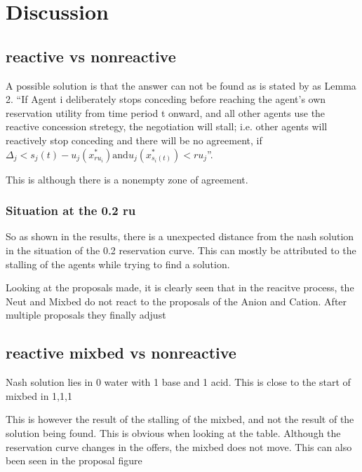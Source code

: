 \section{Discussion}
\subsection{reactive vs nonreactive}
A possible solution is that the answer can not be found as is stated by \citet{zheng2015automated} as Lemma 2. ``If Agent i deliberately stops conceding before reaching the agent's own reservation utility from time period t onward, and all other agents use the reactive concession stretegy, the negotiation will stall; i.e. other agents will reactively stop conceding and there will be no agreement, if $\Delta_j < s_j(t)-u_j(x^*_{ru_i}) \text{and} u_j(x^*_{s_i(t)})<ru_j$''.

This is although there is a nonempty zone of agreement.

\subsubsection{Situation at the 0.2 ru}
So as shown in the results, there is a unexpected distance from the nash solution in the situation of the 0.2 reservation curve. This can mostly be attributed to the stalling of the agents while trying to find a solution.

Looking at the proposals made, it is clearly seen that in the reacitve process, the Neut and Mixbed do not react to the proposals of the Anion and Cation. After multiple proposals they finally adjust 


\subsection{reactive mixbed vs nonreactive}
Nash solution lies in 0 water with 1 base and 1 acid. This is close to the start of mixbed in 1,1,1

This is however the result of the stalling of the mixbed, and not the result of the solution being found. This is obvious when looking at the table. Although the reservation curve changes in the offers, the mixbed does not move. This can also been seen in the proposal figure



